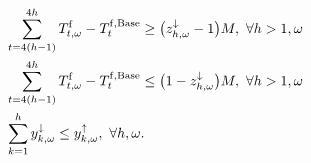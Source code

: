 \documentclass[11pt,a4paper]{article}
\begin{document}
\begin{subequations}
\begin{align}
        \  & \sum_{t=4(h-1)}^{4 h} T^{\rm{f}}_{t, \omega} - T^{\rm{f}, \rm{Base}}_{t} \geq \big( z^{\downarrow}_{h, \omega} -1\big)  M,  \  \forall{h>1,\omega} \label{rebound:3}                                                                                                                                                                                                                                                                                                                                                                                 \\
        \  & \sum_{t=4(h-1)}^{4 h} T^{\rm{f}}_{t, \omega} - T^{\rm{f}, \rm{Base}}_{t} \leq \big(1 - z^{\downarrow}_{h, \omega}\big) M,  \  \forall{h>1,\omega} \label{rebound:4}                                                                                                                                                                                                                                                                                                                                                                                  \\
        \  & \sum_{k=1}^{h} y^{\downarrow}_{k,\omega} \leq y^{\uparrow}_{k, \omega}, \ \forall{h, \omega}. \label{up_reg_first}
    \end{align}
\end{subequations}
\end{document}
